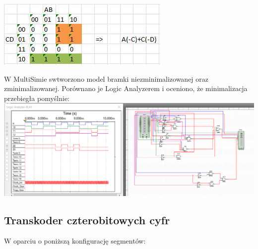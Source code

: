 \documentclass[12pt,a4paper]{article}
\begin{document}
\centering
\includegraphics{2bVog}\\
\raggedright
W MultiSimie swtworzono model bramki niezminimalizowanej oraz zminimalizowanej. Porównano je Logic Analyzerem i oceniono, że minimalizacja przebiegła pomyślnie:
\includegraphics[width=\textwidth]{2b}


\subsection{Transkoder czterobitowych cyfr}
\centering
W oparciu o poniższą konfigurację segmentów:
\end{document}
